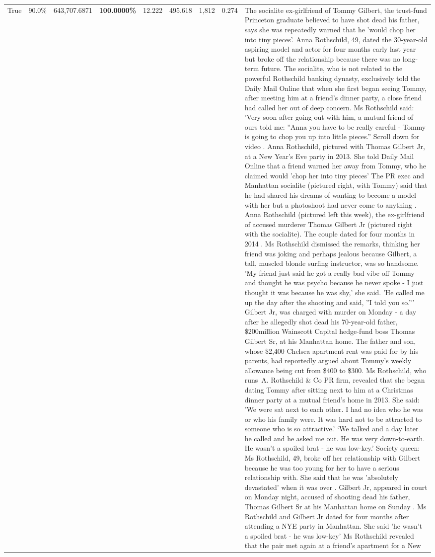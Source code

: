 \begin{table}[H]
\begin{tabular}{lllrlllll}
True & 90.0\% & 643,707.6871 & \bfseries \color{red} 100.0000\% & 12.222 & 495.618 & 1,812 & 0.274 & The socialite ex-girlfriend of Tommy Gilbert, the trust-fund Princeton graduate believed to have shot dead his father, says she was repeatedly warned that he 'would chop her into tiny pieces'. Anna Rothschild, 49, dated the 30-year-old aspiring model and actor for four months early last year but broke off the relationship because there was no long-term future. The socialite, who is not related to the powerful Rothschild banking dynasty, exclusively told the Daily Mail Online that when she first began seeing Tommy, after meeting him at a friend's dinner party, a close friend had called her out of deep concern. Ms Rothschild said: 'Very soon after going out with him, a mutual friend of ours told me: ''Anna you have to be really careful - Tommy is going to chop you up into little pieces.'' Scroll down for video . Anna Rothschild, pictured with Thomas Gilbert Jr, at a New Year's Eve party in 2013. She told Daily Mail Online that a friend warned her away from Tommy, who he claimed would 'chop her into tiny pieces' The PR exec and Manhattan socialite (pictured right, with Tommy) said that he had shared his dreams of wanting to become a model with her but a photoshoot had never come to anything . Anna Rothschild (pictured left this week), the ex-girlfriend of accused murderer Thomas Gilbert Jr (pictured right with the socialite). The couple dated for four months in 2014 . Ms Rothschild dismissed the remarks, thinking her friend was joking and perhaps jealous because Gilbert, a tall, muscled blonde surfing instructor, was so handsome. 'My friend just said he got a really bad vibe off Tommy and thought he was psycho because he never spoke - I just thought it was because he was shy,' she said. 'He called me up the day after the shooting and said, ''I told you so.''' Gilbert Jr, was charged with murder on Monday - a day after he allegedly shot dead his 70-year-old father, \$200million Wainscott Capital hedge-fund boss Thomas Gilbert Sr, at his Manhattan home. The father and son, whose \$2,400 Chelsea apartment rent was paid for by his parents, had reportedly argued about Tommy's weekly allowance being cut from \$400 to \$300. Ms Rothschild, who runs A. Rothschild \& Co PR firm, revealed that she began dating Tommy after sitting next to him at a Christmas dinner party at a mutual friend's home in 2013. She said: 'We were sat next to each other. I had no idea who he was or who his family were. It was hard not to be attracted to someone who is so attractive.' ‘We talked and a day later he called and he asked me out. He was very down-to-earth. He wasn’t a spoiled brat - he was low-key.’ Society queen: Ms Rothschild, 49, broke off her relationship with Gilbert because he was too young for her to have a serious relationship with. She said that he was 'absolutely devastated' when it was over . Gilbert Jr, appeared in court on Monday night, accused of shooting dead his father, Thomas Gilbert Sr at his Manhattan home on Sunday . Ms Rothschild and Gilbert Jr dated for four months after attending a NYE party in Manhattan. She said 'he wasn't a spoiled brat - he was low-key' Ms Rothschild revealed that the pair met again at a friend’s apartment for a New 
\end{tabular}
\end{table}
